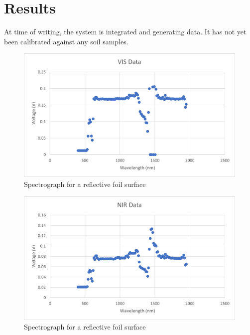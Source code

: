 \documentclass[journal]{IEEEtran}
\begin{document}
\section{Results}
At time of writing, the system is integrated and generating data. It has not yet been calibrated against any soil samples.
\begin{figure}[H]
    \centering
    \label{fig:VIS Data}
    \includegraphics[width=\linewidth]{images/VIS Data.png}
    \caption{Spectrograph for a reflective foil surface}
 \end{figure}
 \begin{figure}[H]
    \centering
    \label{fig:NIR Data}
    \includegraphics[width=\linewidth]{images/NIR Data.png}
    \caption{Spectrograph for a reflective foil surface}
 \end{figure}

\end{document}

